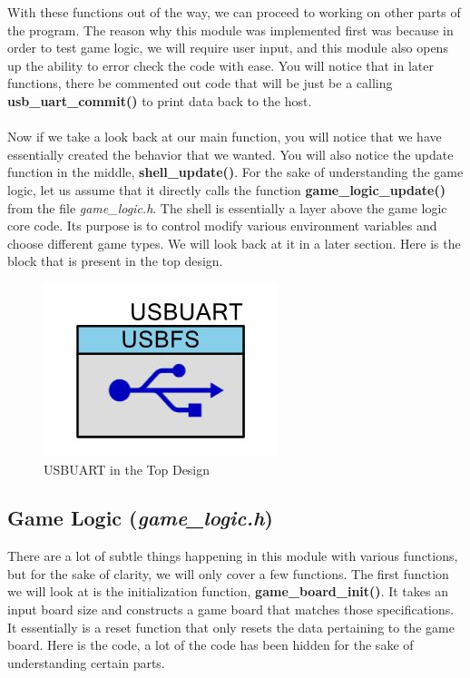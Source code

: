 \documentclass[a4paper, 12pt]{article}
\begin{document}
    With these functions out of the way, we can proceed to working on other
    parts of the program. The reason why this module was implemented first
    was because in order to test game logic, we will require user input, and
    this module also opens up the ability to error check the code with ease.
    You will notice that in later functions, there be commented out code
    that will be just be a calling \textbf{usb\_uart\_commit()} to print
    data back to the host. 
    \\ \\
    Now if we take a look back at our main function, you
    will notice that we have essentially created the behavior that we
    wanted. You will also notice the update function in the middle,
    \textbf{shell\_update()}. For the sake of understanding the game logic, let
    us assume that it directly calls the function \textbf{game\_logic\_update()} from the
    file \textit{game\_logic.h}. The shell is essentially a layer above the
    game logic core code. Its purpose is to control modify various
    environment variables and choose different game types. We will look back
    at it in a later section. Here is the block that is present in the top design.

    \begin{figure}[H]
        \centering
        \includegraphics[scale=0.7]{pics/usb_uart}
        \caption{USBUART in the Top Design}
        \label{fig:TopDesign}
    \end{figure}



    
    \subsection{Game Logic (\textit{game\_logic.h})}

    There are a lot of subtle things happening in this module with various
    functions, but for the sake of clarity, we will only cover a few
    functions. The first function we will look at is the initialization
    function, \textbf{game\_board\_init()}. It takes an input board size and 
    constructs a game board that matches those specifications. It essentially
    is a reset function that only resets the data pertaining to the game
    board. Here is the code, a lot of the code has been hidden for the sake
    of understanding certain parts.
\end{document}
